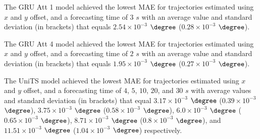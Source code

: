 \begin{table}[!ht]
	\centering
	\caption{The average MAE in $\degree$ ($\times 10^{-3}$), with standard deviation in brackets, across k-fold validation datasets for the trajectories in the k-fold testing datasets estimated using $x$ and $y$ offset, different RNN models, and forecasting times.}
	\label{tab:best_no_abs_MAE}
\end{table}

The GRU Att 1 model achieved the lowest MAE for trajectories estimated using $x$ and $y$ offset, and a forecasting time of $3$ $s$ with an average value and standard deviation (in brackets) that equals $2.54 \times 10^{-3}$ $\degree$ ($0.28 \times 10^{-3}$ $\degree$).

The GRU Att 4 model achieved the lowest MAE for trajectories estimated using $x$ and $y$ offset, and a forecasting time of $2$ $s$ with an average value and standard deviation (in brackets) that equals $1.95 \times 10^{-3}$ $\degree$ ($0.27 \times 10^{-3}$ $\degree$).

The UniTS model achieved the lowest MAE for trajectories estimated using $x$ and $y$ offset, and a forecasting time of $4$, $5$, $10$, $20$, and $30$ $s$ with average values and standard deviation (in brackets) that equal $3.17 \times 10^{-3}$ $\degree$ ($0.39 \times 10^{-3}$ $\degree$), $3.75 \times 10^{-3}$ $\degree$ ($0.58 \times 10^{-3}$ $\degree$), $6.0 \times 10^{-3}$ $\degree$ ($0.65 \times 10^{-3}$ $\degree$), $8.71 \times 10^{-3}$ $\degree$ ($0.8 \times 10^{-3}$ $\degree$), and $11.51 \times 10^{-3}$ $\degree$ ($1.04 \times 10^{-3}$ $\degree$) respectively.

